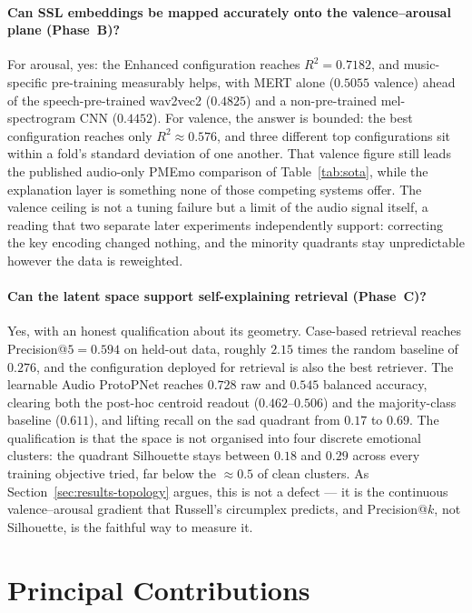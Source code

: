 \documentclass[12pt]{report}
\begin{document}
\paragraph{Can SSL embeddings be mapped accurately onto the valence--arousal plane (Phase~B)?}
For arousal, yes: the Enhanced configuration reaches $R^{2}=0.7182$, and music-specific pre-training measurably helps, with MERT alone ($0.5055$ valence) ahead of the speech-pre-trained wav2vec2 ($0.4825$) and a non-pre-trained mel-spectrogram CNN ($0.4452$). For valence, the answer is bounded: the best configuration reaches only $R^{2}\approx0.576$, and three different top configurations sit within a fold's standard deviation of one another. That valence figure still leads the published audio-only PMEmo comparison of Table~\ref{tab:sota}, while the explanation layer is something none of those competing systems offer. The valence ceiling is not a tuning failure but a limit of the audio signal itself, a reading that two separate later experiments independently support: correcting the key encoding changed nothing, and the minority quadrants stay unpredictable however the data is reweighted.

\paragraph{Can the latent space support self-explaining retrieval (Phase~C)?}
Yes, with an honest qualification about its geometry. Case-based retrieval reaches Precision@$5 = 0.594$ on held-out data, roughly $2.15$ times the random baseline of $0.276$, and the configuration deployed for retrieval is also the best retriever. The learnable Audio ProtoPNet reaches $0.728$ raw and $0.545$ balanced accuracy, clearing both the post-hoc centroid readout ($0.462$--$0.506$) and the majority-class baseline ($0.611$), and lifting recall on the sad quadrant from $0.17$ to $0.69$. The qualification is that the space is not organised into four discrete emotional clusters: the quadrant Silhouette stays between $0.18$ and $0.29$ across every training objective tried, far below the $\approx0.5$ of clean clusters. As Section~\ref{sec:results-topology} argues, this is not a defect --- it is the continuous valence--arousal gradient that Russell's circumplex predicts, and Precision@$k$, not Silhouette, is the faithful way to measure it.

\section{Principal Contributions}
\label{sec:conclusions-contributions}
\end{document}
